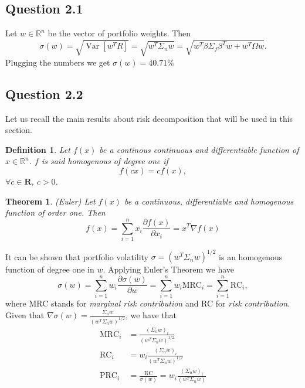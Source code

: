 \documentclass[12pt, a4paper]{article}
\theoremstyle{problemstyle}
\newtheorem{definition}{Definition}[section]
\newtheorem{theorem}{Theorem}[section]
\newcommand{\Var}[1]{\operatorname{Var}\left[#1\right]}
\begin{document}
\subsection{Question 2.1}
Let $w \in \mathbb{R}^n$ be the vector of portfolio weights. Then
\begin{equation}
\sigma(w)=\sqrt{\Var{w^T R}}=\sqrt{w^T\Sigma_n w} = \sqrt{w^T\beta\Sigma_f\beta^Tw + w^T\Omega w}.
\end{equation}
Plugging the numbers we get $\sigma(w)=40.71\%$

\subsection{Question 2.2}
Let us recall the main results about risk decomposition that will be used in this section.
\begin{definition}
	Let $f(x)$ be a continous continuous and differentiable function of $x \in \mathbb{R}^n$. $f$ is said homogenous of degree one if 
	\begin{equation}
	f(cx) = cf(x),
	\end{equation}
	$\forall c \in \mathbf{R}$, $c>0$.
\end{definition}

\begin{theorem}(Euler)
	Let $f(x)$ be a continuous, differentiable and homogenous function of order one. Then 
	\begin{equation}
	f(x) = \sum_{i=1}^{n}x_i \frac{\partial f(x)}{\partial x_i} = x^T \nabla f(x)
	\end{equation}
\end{theorem}


It can be shown that portfolio volatility $\sigma = (w^T\Sigma_n w)^{1/2}$ is an homogenous function of degree one in $w$. Applying Euler's Theorem we have 
\begin{equation}
\sigma(w)=\sum_{i=1}^nw_i \frac{\partial \sigma(w)}{\partial w} = \sum_{i=1}^n w_i \text{MRC}_{i} = \sum_{i=1}^n \text{RC}_{i},
\end{equation}
where MRC stands for \textit{marginal risk contribution} and RC for \textit{risk contribution}. Given that $\nabla\sigma(w) = \frac{\Sigma_n w}{(w^T\Sigma_n w)^{1/2}}$, we have that
\begin{align}
\text{MRC}_i & = \frac{(\Sigma_n w)_i}{(w^T\Sigma_n w)^{1/2}}\\
\text{RC}_i & = w_i \frac{(\Sigma_n w)_i}{(w^T\Sigma_n w)^{1/2}}\\
\text{PRC}_i & = \frac{\text{RC}}{\sigma(w)} = w_i \frac{(\Sigma_n w)_i}{(w^T\Sigma_n w)}
\end{align}
\end{document}
